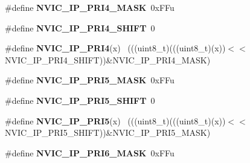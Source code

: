 \begin{DoxyCompactItemize}
\item 
\hypertarget{group___n_v_i_c___register___masks_ga59f57c90bd7c46ed6c87901ac3da11b9}{}\#define {\bfseries N\+V\+I\+C\+\_\+\+I\+P\+\_\+\+P\+R\+I4\+\_\+\+M\+A\+S\+K}~0x\+F\+Fu\label{group___n_v_i_c___register___masks_ga59f57c90bd7c46ed6c87901ac3da11b9}

\item 
\hypertarget{group___n_v_i_c___register___masks_ga264f36af41e6065db5b9ebd5b480cb98}{}\#define {\bfseries N\+V\+I\+C\+\_\+\+I\+P\+\_\+\+P\+R\+I4\+\_\+\+S\+H\+I\+F\+T}~0\label{group___n_v_i_c___register___masks_ga264f36af41e6065db5b9ebd5b480cb98}

\item 
\hypertarget{group___n_v_i_c___register___masks_gaa65e43b9a992f22db3a29f3d80797418}{}\#define {\bfseries N\+V\+I\+C\+\_\+\+I\+P\+\_\+\+P\+R\+I4}(x)                                                ~(((uint8\+\_\+t)(((uint8\+\_\+t)(x))$<$$<$N\+V\+I\+C\+\_\+\+I\+P\+\_\+\+P\+R\+I4\+\_\+\+S\+H\+I\+F\+T))\&N\+V\+I\+C\+\_\+\+I\+P\+\_\+\+P\+R\+I4\+\_\+\+M\+A\+S\+K)\label{group___n_v_i_c___register___masks_gaa65e43b9a992f22db3a29f3d80797418}

\item 
\hypertarget{group___n_v_i_c___register___masks_gadd2c33b343d9554100d927b29516992c}{}\#define {\bfseries N\+V\+I\+C\+\_\+\+I\+P\+\_\+\+P\+R\+I5\+\_\+\+M\+A\+S\+K}~0x\+F\+Fu\label{group___n_v_i_c___register___masks_gadd2c33b343d9554100d927b29516992c}

\item 
\hypertarget{group___n_v_i_c___register___masks_ga4e187f129a89901a64f5c31138ad7bb9}{}\#define {\bfseries N\+V\+I\+C\+\_\+\+I\+P\+\_\+\+P\+R\+I5\+\_\+\+S\+H\+I\+F\+T}~0\label{group___n_v_i_c___register___masks_ga4e187f129a89901a64f5c31138ad7bb9}

\item 
\hypertarget{group___n_v_i_c___register___masks_ga175549509ad3b81d1fd48a78572d7dc5}{}\#define {\bfseries N\+V\+I\+C\+\_\+\+I\+P\+\_\+\+P\+R\+I5}(x)                                                ~(((uint8\+\_\+t)(((uint8\+\_\+t)(x))$<$$<$N\+V\+I\+C\+\_\+\+I\+P\+\_\+\+P\+R\+I5\+\_\+\+S\+H\+I\+F\+T))\&N\+V\+I\+C\+\_\+\+I\+P\+\_\+\+P\+R\+I5\+\_\+\+M\+A\+S\+K)\label{group___n_v_i_c___register___masks_ga175549509ad3b81d1fd48a78572d7dc5}

\item 
\hypertarget{group___n_v_i_c___register___masks_gabe1c4b7db20634e365bae4ff7299baaf}{}\#define {\bfseries N\+V\+I\+C\+\_\+\+I\+P\+\_\+\+P\+R\+I6\+\_\+\+M\+A\+S\+K}~0x\+F\+Fu\label{group___n_v_i_c___register___masks_gabe1c4b7db20634e365bae4ff7299baaf}


\end{DoxyCompactItemize}

